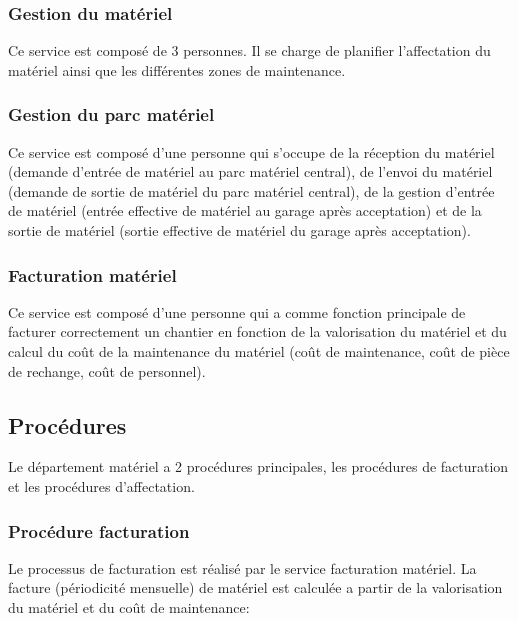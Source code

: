 \documentclass[twoside]{article}
\begin{document}
	\subsubsection{Gestion du matériel}

	Ce service est composé de 3 personnes. Il se charge de planifier
    l'affectation du matériel ainsi que les différentes zones de
    maintenance.
	
	\subsubsection{Gestion du parc matériel}
	
    Ce service est composé d'une personne qui s'occupe de la réception
    du matériel (demande d'entrée de matériel au parc matériel central),
    de l'envoi du matériel (demande de sortie de matériel du parc matériel
    central), de la gestion d'entrée de matériel (entrée effective de
    matériel au garage après acceptation) et de la sortie de matériel
    (sortie effective de matériel du garage après acceptation).
		
	\subsubsection{Facturation matériel}
	
    Ce service est composé d'une personne qui a comme fonction principale de
    facturer correctement un chantier en fonction de la valorisation du
    matériel et du calcul du coût de la maintenance du matériel (coût de 
    maintenance, coût de pièce de rechange, coût de personnel).
	
\subsection{Procédures}
	
    Le département matériel a 2 procédures principales, les procédures de
    facturation et les procédures d'affectation.

\subsubsection{Procédure facturation}

	Le processus de facturation est réalisé par le service facturation
    matériel. La facture (périodicité mensuelle) de matériel est calculée a
    partir de la valorisation du matériel et du coût de maintenance:
\end{document}
